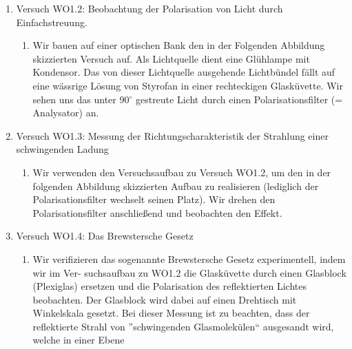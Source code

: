 \documentclass[12pt]{scrartcl}
\begin{document}
\begin{enumerate}
\begin{enumerate}
\end{enumerate}
\item Versuch WO1.2: Beobachtung der Polarisation von Licht durch Einfachstreuung.\\
\begin{enumerate}
\item Wir bauen auf einer optischen Bank den in der Folgenden Abbildung skizzierten
Versuch auf.
Als Lichtquelle dient eine Glühlampe mit Kondensor. Das von dieser Lichtquelle ausgehende Lichtbündel fällt auf eine wässrige Lösung von Styrofan in einer rechteckigen Glasküvette.
Wir sehen uns das unter
90$^\circ$ gestreute Licht durch einen Polarisationsfilter (= Analysator) an. 
\end{enumerate}
\item Versuch WO1.3: Messung der Richtungscharakteristik der Strahlung einer schwingenden Ladung\\
\begin{enumerate}
\item Wir verwenden den Versuchsaufbau zu Versuch WO1.2, um den in der folgenden Abbildung skizzierten Aufbau zu realisieren (lediglich der Polarisationsfilter wechselt seinen Platz).
Wir drehen den Polarisationsfilter anschließend und beobachten den Effekt.
\end{enumerate}
\item Versuch WO1.4: Das Brewstersche Gesetz\\
\begin{enumerate}
\item Wir verifizieren das sogenannte Brewstersche Gesetz experimentell, indem wir im Ver-
suchsaufbau zu WO1.2 die Glasküvette durch einen Glasblock (Plexiglas) ersetzen und
die Polarisation des reflektierten Lichtes beobachten.
Der Glasblock wird dabei auf einen Drehtisch mit Winkelskala gesetzt.
Bei dieser Messung ist zu beachten, dass der reflektierte Strahl von ”schwingenden Glasmolekülen“ ausgesandt wird, welche in einer Ebene

\end{enumerate}
\end{enumerate}
\end{document}
